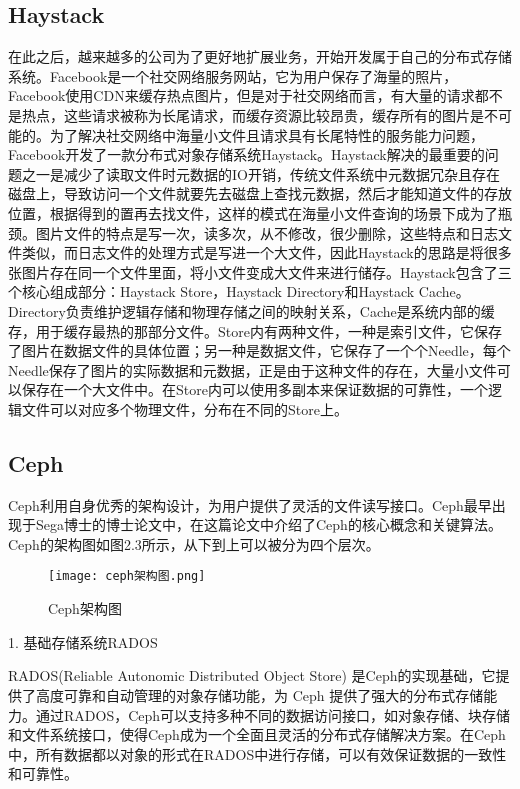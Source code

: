 \subsection{Haystack}%
在此之后，越来越多的公司为了更好地扩展业务，开始开发属于自己的分布式存储系统。Facebook是一个社交网络服务网站，它为用户保存了海量的照片， Facebook使用CDN来缓存热点图片，但是对于社交网络而言，有大量的请求都不是热点，这些请求被称为长尾请求，而缓存资源比较昂贵，缓存所有的图片是不可能的。为了解决社交网络中海量小文件且请求具有长尾特性的服务能力问题，Facebook开发了一款分布式对象存储系统Haystack。Haystack解决的最重要的问题之一是减少了读取文件时元数据的IO开销，传统文件系统中元数据冗杂且存在磁盘上，导致访问一个文件就要先去磁盘上查找元数据，然后才能知道文件的存放位置，根据得到的置再去找文件，这样的模式在海量小文件查询的场景下成为了瓶颈。图片文件的特点是写一次，读多次，从不修改，很少删除，这些特点和日志文件类似，而日志文件的处理方式是写进一个大文件，因此Haystack的思路是将很多张图片存在同一个文件里面，将小文件变成大文件来进行储存。Haystack包含了三个核心组成部分：Haystack Store，Haystack Directory和Haystack Cache。Directory负责维护逻辑存储和物理存储之间的映射关系，Cache是系统内部的缓存，用于缓存最热的那部分文件。Store内有两种文件，一种是索引文件，它保存了图片在数据文件的具体位置；另一种是数据文件，它保存了一个个Needle，每个Needle保存了图片的实际数据和元数据，正是由于这种文件的存在，大量小文件可以保存在一个大文件中。在Store内可以使用多副本来保证数据的可靠性，一个逻辑文件可以对应多个物理文件，分布在不同的Store上。

\subsection{Ceph}%
Ceph\cite{27}利用自身优秀的架构设计，为用户提供了灵活的文件读写接口。Ceph最早出现于Sega博士的博士论文中\cite{28}，在这篇论文中介绍了Ceph的核心概念和关键算法。Ceph的架构图如图2.3所示，从下到上可以被分为四个层次。

\begin{figure}
    \centering
    \texttt{[image: ceph架构图.png]}
    \caption{Ceph架构图}
\end{figure}

1. 基础存储系统RADOS\cite{29,30}

RADOS(Reliable Autonomic Distributed Object Store) 是Ceph的实现基础，它提供了高度可靠和自动管理的对象存储功能，为 Ceph 提供了强大的分布式存储能力。通过RADOS，Ceph可以支持多种不同的数据访问接口，如对象存储、块存储和文件系统接口，使得Ceph成为一个全面且灵活的分布式存储解决方案。在Ceph中，所有数据都以对象的形式在RADOS中进行存储，可以有效保证数据的一致性和可靠性。

